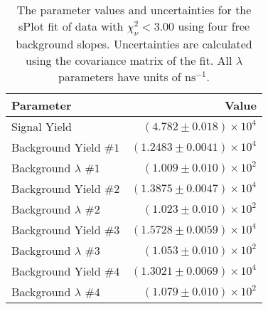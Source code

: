 
\begin{table}[ht]
    \begin{center}
        \begin{tabular}{lr}\toprule
            Parameter & Value \\\midrule
            Signal Yield & $(4.782 \pm 0.018) \times 10^{4}$ \\
            Background Yield $\#1$ & $(1.2483 \pm 0.0041) \times 10^{4}$ \\
            Background $\lambda$ $\#1$ & $(1.009 \pm 0.010) \times 10^{2}$ \\
            Background Yield $\#2$ & $(1.3875 \pm 0.0047) \times 10^{4}$ \\
            Background $\lambda$ $\#2$ & $(1.023 \pm 0.010) \times 10^{2}$ \\
            Background Yield $\#3$ & $(1.5728 \pm 0.0059) \times 10^{4}$ \\
            Background $\lambda$ $\#3$ & $(1.053 \pm 0.010) \times 10^{2}$ \\
            Background Yield $\#4$ & $(1.3021 \pm 0.0069) \times 10^{4}$ \\
            Background $\lambda$ $\#4$ & $(1.079 \pm 0.010) \times 10^{2}$ \\\bottomrule
        \end{tabular}
        \caption{The parameter values and uncertainties for the sPlot fit of data with $\chi^2_\nu < 3.00$ using four free background slopes. Uncertainties are calculated using the covariance matrix of the fit. All $\lambda$ parameters have units of $\si{\nano\second}^{-1}$.}\label{tab:splot-fit-results-chisqdof-3.00-free-4}
    \end{center}
\end{table}

